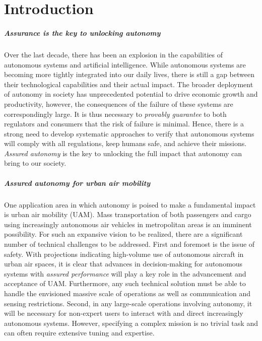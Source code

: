 \chapter{Introduction}
\paragraph{Assurance is the key to unlocking autonomy} Over the last decade, there has been an explosion in the capabilities of autonomous systems and artificial intelligence. While autonomous systems are becoming more tightly integrated into our daily lives, there is still a gap between their technological capabilities and their actual impact. The broader deployment of autonomy in society has unprecedented potential to drive economic growth and productivity, however, the consequences of the failure of these systems are correspondingly large. It is thus necessary to \emph{provably guarantee} to both regulators and consumers that the risk of failure is minimal. Hence, there is a strong need to develop systematic approaches to verify that autonomous systems will comply with all regulations, keep humans safe, and achieve their missions. \emph{Assured autonomy} is the key to unlocking the full impact that autonomy can bring to our society. 


\paragraph{Assured autonomy for urban air mobility} One application area in which autonomy is poised to make a fundamental impact is urban air mobility (UAM). Mass transportation of both passengers and cargo using increasingly autonomous air vehicles in metropolitan areas is an imminent possibility. For such an expansive vision to be realized, there are a significant number of technical challenges to be addressed.  First and foremost is the issue of safety. With projections indicating high-volume use of autonomous aircraft in urban air spaces, it is clear that advances in decision-making for autonomous systems with \emph{assured performance} will play a key role in the advancement and acceptance of UAM. Furthermore, any such technical solution must be able to handle the envisioned massive scale of operations as well as communication and sensing restrictions. Second, in any large-scale operations involving autonomy, it will be necessary for non-expert users to interact with and direct increasingly autonomous systems. However, specifying a complex mission is no trivial task and can often require extensive tuning and expertise.

